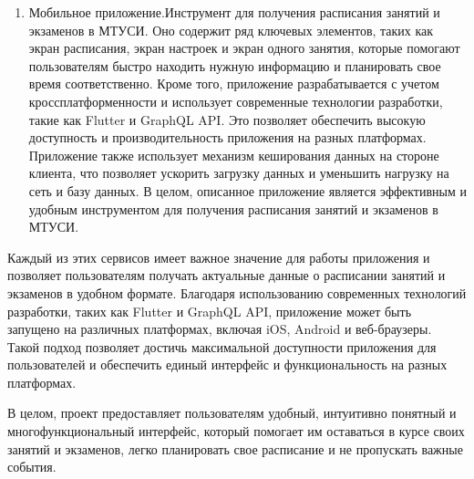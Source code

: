 \begin{enumerate}
    \item Мобильное приложение.Инструмент для получения расписания занятий и экзаменов в МТУСИ.
    Оно содержит ряд ключевых элементов, таких как экран расписания, экран настроек и экран одного занятия,
    которые помогают пользователям быстро находить нужную информацию и
    планировать свое время соответственно. Кроме того, приложение разрабатывается с
    учетом кроссплатформенности и использует современные технологии разработки,
    такие как Flutter и GraphQL API.
    Это позволяет обеспечить высокую доступность и производительность приложения на разных платформах.
    Приложение также использует механизм кеширования данных на стороне клиента,
    что позволяет ускорить загрузку данных и уменьшить нагрузку на сеть и базу данных.
    В целом, описанное приложение является эффективным и удобным инструментом для получения расписания занятий и экзаменов в МТУСИ.

\end{enumerate}
Каждый из этих сервисов имеет важное значение для работы приложения и позволяет
пользователям получать актуальные данные о расписании занятий и экзаменов в удобном формате. 
Благодаря использованию современных технологий разработки, таких как Flutter и GraphQL API,
приложение может быть запущено на различных платформах,
включая iOS, Android и веб-браузеры.
Такой подход позволяет достичь максимальной доступности приложения для пользователей и
обеспечить единый интерфейс и функциональность на разных платформах.

В целом, проект предоставляет пользователям удобный,
интуитивно понятный и многофункциональный интерфейс, который помогает им
оставаться в курсе своих занятий и экзаменов,
легко планировать свое расписание и не пропускать важные события.